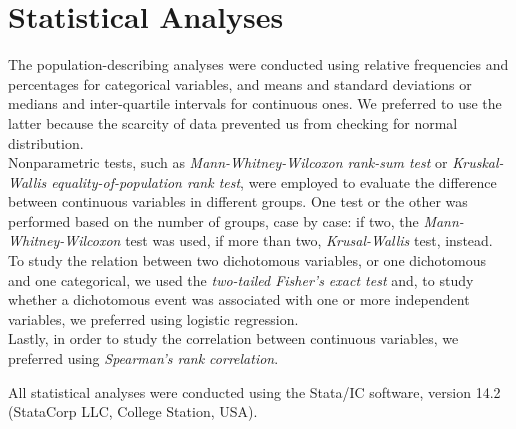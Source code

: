 \section{Statistical Analyses}\label{sec:statisticalanalyses}
The population-describing analyses were conducted using relative frequencies and percentages for categorical variables, and means and standard deviations or medians and inter-quartile intervals for continuous ones. We preferred to use the latter because the scarcity of data prevented us from checking for normal distribution.\\
Nonparametric tests, such as \textit{Mann-Whitney-Wilcoxon rank-sum test} or \textit{Kruskal-Wallis equality-of-population rank test}, were employed to evaluate the difference between continuous variables in different groups. One test or the other was performed based on the number of groups, case by case: if two, the \textit{Mann-Whitney-Wilcoxon} test was used, if more than two, \textit{Krusal-Wallis} test, instead. To study the relation between two dichotomous variables, or one dichotomous and one categorical, we used the \textit{two-tailed Fisher's exact test} and, to study whether a dichotomous event was associated with one or more independent variables, we preferred using logistic regression.\\
Lastly, in order to study the correlation between continuous variables, we preferred using \textit{Spearman's rank correlation}.

All statistical analyses were conducted using the Stata/IC software, version 14.2 (StataCorp LLC, College Station, USA).